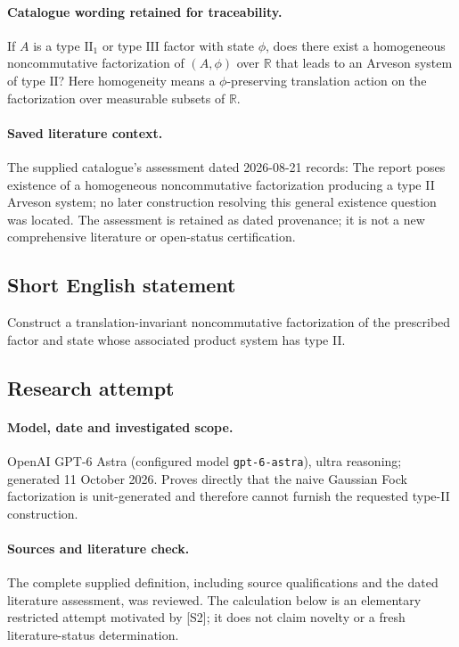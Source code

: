 \documentclass[11pt]{article}
\begin{document}
\paragraph{Catalogue wording retained for traceability.}
If $A$ is a type $\mathrm{II}_1$ or type $\mathrm{III}$ factor with state $\phi$, does there exist a homogeneous noncommutative factorization of $(A,\phi)$ over $\mathbb R$ that leads to an Arveson system of type $\mathrm{II}$? Here homogeneity means a $\phi$-preserving translation action on the factorization over measurable subsets of $\mathbb R$.

\paragraph{Saved literature context.} The supplied catalogue's assessment dated 2026-08-21 records: The report poses existence of a homogeneous noncommutative factorization producing a type II Arveson system; no later construction resolving this general existence question was located. The assessment is retained as dated provenance; it is not a new comprehensive literature or open-status certification.
\subsection{Short English statement}
Construct a translation-invariant noncommutative factorization of the prescribed factor and state whose associated product system has type II.
\subsection{Research attempt}
\paragraph{Model, date and investigated scope.}
OpenAI GPT-6 Astra (configured model \texttt{gpt-6-astra}), ultra reasoning; generated 11 October 2026. Proves directly that the naive Gaussian Fock factorization is unit-generated and therefore cannot furnish the requested type-II construction.

\paragraph{Sources and literature check.}
The complete supplied definition, including source qualifications and the dated literature assessment, was reviewed. The calculation below is an elementary restricted attempt motivated by [S2]; it does not claim novelty or a fresh literature-status determination.
\end{document}
